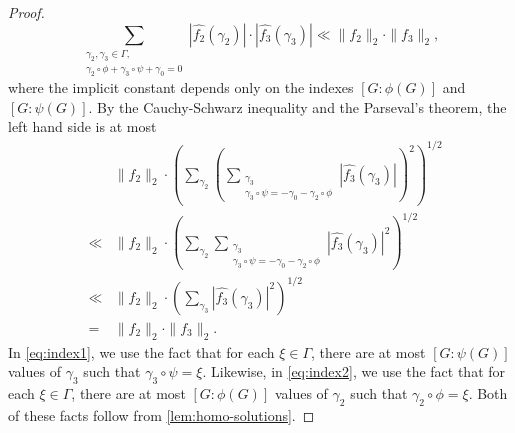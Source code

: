 \begin{proof}
\[
\sum_{\substack{ \gamma_2, \gamma_3 \in \Gamma,\\ \gamma_2 \circ \phi + \gamma_3 \circ \psi + \gamma_0=0}} |\widehat{f_2}(\gamma_2) | \cdot | \widehat{f_3}(\gamma_3) | \ll \|f_2 \|_2 \cdot \| f_3 \|_2,
\]
where the implicit constant depends only on the indexes $[G:\phi(G)]$ and $[G:\psi(G)]$.
By the Cauchy-Schwarz inequality and the Parseval's theorem, the left hand side is at most
\begin{eqnarray}
& & \| f_2 \|_2 \cdot \left( \sum_{\gamma_2} \left( \sum_{\substack{\gamma_3 \\ \gamma_3 \circ \psi = - \gamma_0 - \gamma_2 \circ \phi}} | \widehat{f_3}(\gamma_3) | \right)^2  \right)^{1/2} \nonumber \\
& \ll & \| f_2 \|_2 \cdot \left( \sum_{\gamma_2} \sum_{\substack{\gamma_3 \\ \gamma_3 \circ \psi = - \gamma_0 - \gamma_2 \circ \phi}} | \widehat{f_3}(\gamma_3) |^2  \right)^{1/2} \label{eq:index1} \\
& \ll & \| f_2 \|_2 \cdot \left( \sum_{\gamma_3}  | \widehat{f_3}(\gamma_3) |^2  \right)^{1/2} \label{eq:index2} \\
&=& \| f_2 \|_2 \cdot \| f_3 \|_2. \nonumber
\end{eqnarray}
In \eqref{eq:index1}, we use the fact that for each $\xi \in \Gamma$, there are at most $[G: \psi(G)]$ values of $\gamma_3$ such that $\gamma_3 \circ \psi = \xi$. Likewise, in \eqref{eq:index2}, we use the fact that for each $\xi \in \Gamma$, there are at most $[G: \phi(G)]$ values of $\gamma_2$ such that $\gamma_2 \circ \phi = \xi$. Both of these facts follow from \cref{lem:homo-solutions}.
\end{proof}


